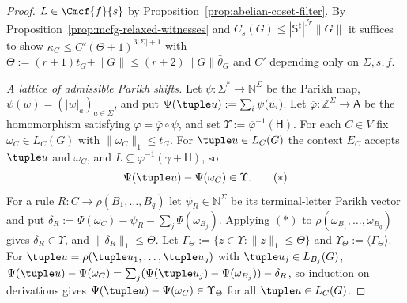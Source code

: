 \begin{proof}
$L\in\Cmcf{f}{s}$ by Proposition~\ref{prop:abelian-coset-filter}.  By
Proposition~\ref{prop:mcfg-relaxed-witnesses} and
$C_s(G)\le|\mathsf S^\sharp|^{fr}\|G\|$ it suffices to show
$\kappa_G\le C'(\Theta+1)^{3|\Sigma|+1}$ with $\Theta:=(r+1)t_G+\|G\|\le(r+2)\|G\|\bar\theta_G$
and $C'$ depending only on $\Sigma,s,f$.

\emph{A lattice of admissible Parikh shifts.}  Let
$\psi:\Sigma^*\to\mathbb N^\Sigma$ be the Parikh map,
$\psi(w)=(|w|_a)_{a\in\Sigma}$, and put
$\Psi(\tuple u):=\sum_i\psi(u_i)$.  Let
$\overline\varphi:\mathbb Z^\Sigma\to\mathsf A$ be the homomorphism
satisfying $\varphi=\overline\varphi\circ\psi$, and set
$\Upsilon:=\overline\varphi^{-1}(\mathsf H)$.  For each $C\in V$ fix
$\omega_C\in L_C(G)$ with $\|\omega_C\|_1\le t_G$.  For $\tuple u\in L_C(G)$ the
context $E_C$ accepts $\tuple u$ and $\omega_C$, and $L\subseteq\varphi^{-1}(\gamma+\mathsf H)$,
so
\[
 \Psi(\tuple u)-\Psi(\omega_C)\in\Upsilon.\tag{$*$}
\]
For a rule $R:C\to\rho(B_1,\ldots,B_q)$ let $\psi_R\in\mathbb N^\Sigma$
be its terminal-letter Parikh vector and put
$\delta_R:=\Psi(\omega_C)-\psi_R-\sum_j\Psi(\omega_{B_j})$.  Applying $(*)$ to
$\rho(\omega_{B_1},\ldots,\omega_{B_q})$ gives $\delta_R\in\Upsilon$, and
$\|\delta_R\|_1\le \Theta$.  Let $\Gamma_\Theta:=\{z\in\Upsilon:\|z\|_1\le \Theta\}$ and
$\Upsilon_\Theta:=\langle\Gamma_\Theta\rangle$.  For $\tuple u=\rho(\tuple u_1,\ldots,\tuple u_q)$
with $\tuple u_j\in L_{B_j}(G)$,
$\Psi(\tuple u)-\Psi(\omega_C)=\sum_j(\Psi(\tuple u_j)-\Psi(\omega_{B_j}))-\delta_R$,
so induction on derivations gives $\Psi(\tuple u)-\Psi(\omega_C)\in\Upsilon_\Theta$ for all
$\tuple u\in L_C(G)$.


\end{proof}

